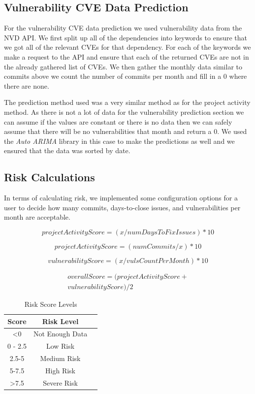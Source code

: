 \documentclass[conference]{IEEEtran}
\begin{document}
\subsection{Vulnerability CVE Data Prediction}
For the vulnerability CVE data prediction we used vulnerability data from the NVD API. We first split up all of the dependencies into keywords to ensure that we got all of the relevant CVEs for that dependency. For each of the keywords we make a request to the API and ensure that each of the returned CVEs are not in the already gathered list of CVEs. We then gather the monthly data similar to commits above we count the number of commits per month and fill in a 0 where there are none. 

The prediction method used was a very similar method as for the project activity method. As there is not a lot of data for the vulnerability prediction section we can assume if the values are constant or there is no data then we can safely assume that there will be no vulnerabilities that month and return a 0. We used the \textit{Auto ARIMA} library in this case to make the predictions as well and we ensured that the data was sorted by date. 


\subsection{Risk Calculations}
In terms of calculating risk, we implemented some configuration options for a user to decide how many commits, days-to-close issues, and vulnerabilities per month are acceptable. 

\[ projectActivityScore = ( x / numDaysToFixIssues ) * 10\]

\[ projectActivityScore = ( numCommits / x ) * 10\]

\[vulnerabilityScore = ( x / vulsCountPerMonth ) * 10\]

\begin{multline*}
  overallScore = ( projectActivityScore +\\ vulnerabilityScore) / 2 
\end{multline*}

\begin{table}[H]
 \caption{Risk Score Levels}
\label{risklevels}
\begin{center}
\begin{tabular}{|c|c|c|}
\hline
    \textbf{Score} & \textbf{Risk Level} \\ \hline
    \textless  0 & Not Enough Data \\ \hline
    0 - 2.5 & Low Risk \\ \hline
    2.5-5 & Medium Risk \\ \hline
    5-7.5 & High Risk \\ \hline
    \textgreater 7.5  & Severe Risk \\ \hline
\end{tabular}
\end{center}
\end{table}
\end{document}
